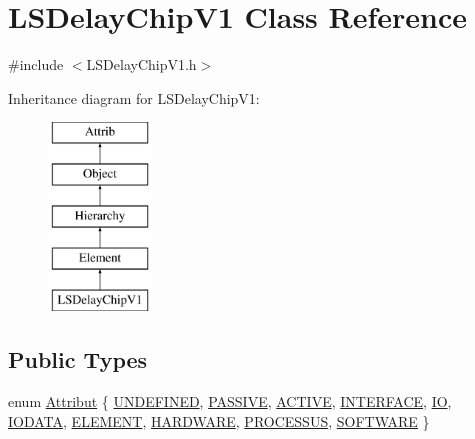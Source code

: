\hypertarget{classLSDelayChipV1}{}\section{L\+S\+Delay\+Chip\+V1 Class Reference}
\label{classLSDelayChipV1}


{\ttfamily \#include $<$L\+S\+Delay\+Chip\+V1.\+h$>$}

Inheritance diagram for L\+S\+Delay\+Chip\+V1\+:\begin{figure}[H]
\begin{center}
\leavevmode
\includegraphics[height=5.000000cm]{classLSDelayChipV1}
\end{center}
\end{figure}
\subsection*{Public Types}
\begin{DoxyCompactItemize}
\item 
enum \hyperlink{classAttrib_a69e171d7cc6417835a5a306d3c764235}{Attribut} \{ \newline
\hyperlink{classAttrib_a69e171d7cc6417835a5a306d3c764235a3a8da2ab97dda18aebab196fe4100531}{U\+N\+D\+E\+F\+I\+N\+ED}, 
\hyperlink{classAttrib_a69e171d7cc6417835a5a306d3c764235a2bfb2af57b87031d190a05fe25dd92ed}{P\+A\+S\+S\+I\+VE}, 
\hyperlink{classAttrib_a69e171d7cc6417835a5a306d3c764235a3b1fec929c0370d1436f2f06e298fb0d}{A\+C\+T\+I\+VE}, 
\hyperlink{classAttrib_a69e171d7cc6417835a5a306d3c764235aa27c16b480a369ea4d18b07b2516bbc7}{I\+N\+T\+E\+R\+F\+A\+CE}, 
\newline
\hyperlink{classAttrib_a69e171d7cc6417835a5a306d3c764235a1420a5b8c0540b2af210b6975eded7f9}{IO}, 
\hyperlink{classAttrib_a69e171d7cc6417835a5a306d3c764235a0af3b0d0ac323c1704e6c69cf90add28}{I\+O\+D\+A\+TA}, 
\hyperlink{classAttrib_a69e171d7cc6417835a5a306d3c764235a7788bc5dd333fd8ce18562b269c9dab1}{E\+L\+E\+M\+E\+NT}, 
\hyperlink{classAttrib_a69e171d7cc6417835a5a306d3c764235a61ceb22149f365f1780d18f9d1459423}{H\+A\+R\+D\+W\+A\+RE}, 
\newline
\hyperlink{classAttrib_a69e171d7cc6417835a5a306d3c764235a75250e29692496e73effca2c0330977f}{P\+R\+O\+C\+E\+S\+S\+US}, 
\hyperlink{classAttrib_a69e171d7cc6417835a5a306d3c764235a103a67cd0b8f07ef478fa45d4356e27b}{S\+O\+F\+T\+W\+A\+RE}
 \}
\end{DoxyCompactItemize}
